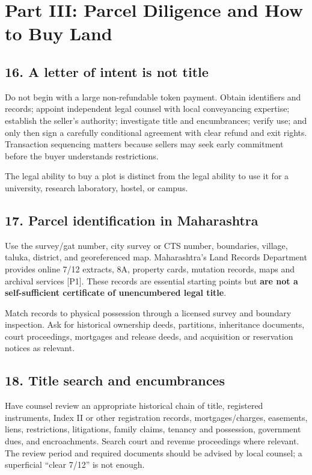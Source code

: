\section*{Part III: Parcel Diligence and How to Buy Land}


\subsection{16. A letter of intent is not title}

Do not begin with a large non-refundable token payment. Obtain identifiers and records; appoint independent legal counsel with local conveyancing expertise; establish the seller's authority; investigate title and encumbrances; verify use; and only then sign a carefully conditional agreement with clear refund and exit rights. Transaction sequencing matters because sellers may seek early commitment before the buyer understands restrictions.

The legal ability to buy a plot is distinct from the legal ability to use it for a university, research laboratory, hostel, or campus.


\subsection{17. Parcel identification in Maharashtra}

Use the survey/gat number, city survey or CTS number, boundaries, village, taluka, district, and georeferenced map. Maharashtra's Land Records Department provides online 7/12 extracts, 8A, property cards, mutation records, maps and archival services [P1]. These records are essential starting points but \textbf{are not a self-sufficient certificate of unencumbered legal title}.

Match records to physical possession through a licensed survey and boundary inspection. Ask for historical ownership deeds, partitions, inheritance documents, court proceedings, mortgages and release deeds, and acquisition or reservation notices as relevant.


\subsection{18. Title search and encumbrances}

Have counsel review an appropriate historical chain of title, registered instruments, Index II or other registration records, mortgages/charges, easements, liens, restrictions, litigations, family claims, tenancy and possession, government dues, and encroachments. Search court and revenue proceedings where relevant. The review period and required documents should be advised by local counsel; a superficial ``clear 7/12'' is not enough.

